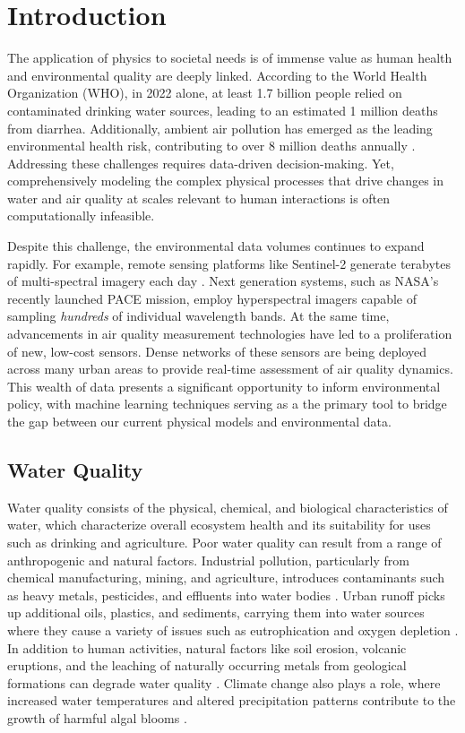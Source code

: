 \chapter{Introduction}\label{ch:intro}


The application of physics to societal needs is of immense value as
human health and environmental quality are deeply linked. According to
the World Health Organization (WHO), in 2022 alone, at least 1.7 billion people
relied on contaminated drinking water sources, leading to an estimated 1 million
deaths from diarrhea. Additionally, ambient air pollution has emerged as the
leading environmental health risk, contributing to over 8 million deaths
annually \cite{air-pollution-mortality}. Addressing these challenges requires
data-driven decision-making. Yet, comprehensively modeling the complex physical
processes that drive changes in water and air quality at scales relevant to
human interactions is often computationally infeasible.

Despite this challenge, the environmental data volumes continues to expand
rapidly. For example, remote sensing platforms like Sentinel-2 generate
terabytes of multi-spectral imagery each day \cite{sentinel-2-data}. Next
generation systems, such as NASA’s recently launched PACE mission,
employ hyperspectral imagers capable of sampling \textit{hundreds} of individual
wavelength bands. At the same time, advancements in air quality measurement
technologies have led to a proliferation of new, low-cost sensors. Dense
networks of these sensors are being deployed across many urban areas to provide
real-time assessment of air quality dynamics. This wealth of data presents a
significant opportunity to inform environmental policy, with machine learning
techniques serving as a the primary tool to bridge the gap between our current
physical models and environmental data.




\section{Water Quality}

Water quality consists of the physical, chemical, and biological characteristics
of water, which characterize overall ecosystem health and its suitability for
uses such as drinking and agriculture. Poor water quality can result from a
range of anthropogenic and natural factors. Industrial pollution, particularly
from chemical manufacturing, mining, and agriculture, introduces
contaminants such as heavy metals, pesticides, and effluents into water
bodies \cite{schwarzenbach-water-pollution}. Urban runoff
picks up additional oils, plastics, and sediments, carrying them into
water sources where they cause a variety of issues such as
eutrophication and oxygen depletion \cite{smith-eutrophication}.
In addition to human activities, natural factors like soil erosion, volcanic
eruptions, and the leaching of naturally occurring metals from geological
formations can degrade water quality \cite{water-quality-natural}. Climate
change also plays a role, where increased water temperatures and altered
precipitation patterns contribute to the growth of harmful algal blooms
\cite{climate-change-water-quality}.

